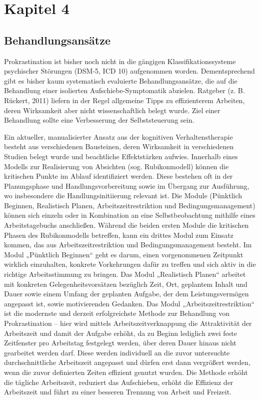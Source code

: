 \chapter{Kapitel 4}
\label{cha:kapitel-4}

\section{Behandlungsansätze}
\label{sec:behandlungsansätze}
Prokrastination ist bisher noch nicht in die gängigen Klassifikationssysteme psychischer Störungen (DSM-5, ICD 10) aufgenommen worden.
Dementsprechend gibt es bisher kaum systematisch evaluierte Behandlungsansätze, die auf die Behandlung einer isolierten Aufschiebe-Symptomatik abzielen. Ratgeber (z. B. Rückert, 2011\cite{wiki}) liefern in der Regel allgemeine Tipps zu effizienterem Arbeiten, deren
Wirksamkeit aber nicht wissenschaftlich belegt wurde. Ziel einer Behandlung sollte eine Verbesserung der Selbststeuerung sein.

Ein aktueller, manualisierter Ansatz\cite{hoecker:2013} aus der kognitiven Verhaltenstherapie besteht aus verschiedenen Bausteinen, deren
Wirksamkeit in verschiedenen Studien\cite{wiki} belegt wurde und beachtliche Effektstärken aufwies. Innerhalb eines Modells zur
Realisierung von Absichten (sog. Rubikonmodell) können die kritischen Punkte im Ablauf identifiziert werden. Diese bestehen oft in der
Planungsphase und Handlungsvorbereitung sowie im Übergang zur Ausführung, wo insbesondere die Handlungsinitiierung relevant ist. Die
Module (Pünktlich Beginnen, Realistisch Planen, Arbeitszeitrestriktion und Bedingungsmanagement) können sich einzeln oder in Kombination
an eine Selbstbeobachtung mithilfe eines Arbeitstagebuchs anschließen. Während die beiden ersten Module die kritischen Phasen des
Rubikonmodells betreffen, kann ein drittes Modul zum Einsatz kommen, das aus Arbeitszeitrestriktion und Bedingungsmanagement besteht. Im
Modul „Pünktlich Beginnen“ geht es darum, einen vorgenommenen Zeitpunkt wirklich einzuhalten, konkrete Vorkehrungen dafür zu treffen und
sich aktiv in die richtige Arbeitsstimmung zu bringen. Das Modul „Realistisch Planen“ arbeitet mit konkreten Gelegenheitsvorsätzen
bezüglich Zeit, Ort, geplantem Inhalt und Dauer sowie einem Umfang der geplanten Aufgabe, der dem Leistungsvermögen angepasst ist, sowie
motivierenden Gedanken. Das Modul „Arbeitszeitrestriktion“ ist die modernste und derzeit erfolgreichste Methode zur Behandlung von
Prokrastination – hier wird mittels Arbeitszeitverknappung die Attraktivität der Arbeitszeit und damit der Aufgabe erhöht, da zu Beginn
lediglich zwei feste Zeitfenster pro Arbeitstag festgelegt werden, über deren Dauer hinaus nicht gearbeitet werden darf. Diese werden
individuell an die zuvor untersuchte durchschnittliche Arbeitszeit angepasst und dürfen erst dann vergrößert werden, wenn die zuvor
definierten Zeiten effizient genutzt wurden. Die Methode erhöht die tägliche Arbeitszeit, reduziert das Aufschieben, erhöht die Effizienz
der Arbeitszeit und führt zu einer besseren Trennung von Arbeit und Freizeit.
